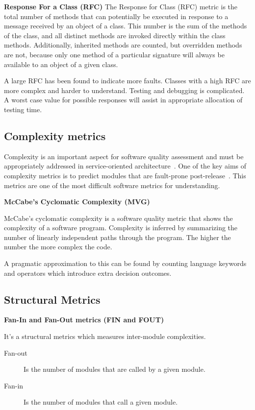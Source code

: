 \textbf{Response For a Class (RFC)} 
The Response for Class (RFC) metric is the total number of methods that can potentially be executed in response to a message received by an object of a class. This number is the sum of the methods of the class, and all distinct methods are invoked directly within the class methods. Additionally, inherited
methods are counted, but overridden methods are not, because only one method of a particular signature will always be available to an object of a given class.

A large RFC has been found to indicate more faults. Classes with a high RFC are more complex and harder to understand. Testing and debugging is complicated. A worst case value for possible responses will assist in appropriate allocation of testing time.
\subsection{Complexity metrics}
Complexity is an important aspect for software quality assessment and must be appropriately addressed in service-oriented architecture~\cite{complexity}. One  of  the  key  aims  of  complexity  metrics  is  to  predict modules   that are fault-prone post-release~\cite{complexity2}. This metrics are one of the most difficult software metrics for understanding.

\textbf{McCabe's Cyclomatic Complexity (MVG)}

McCabe's cyclomatic complexity is a software quality metric that shows the complexity of a software program. Complexity is inferred by summarizing the number of linearly independent paths through the program. The higher the number the more complex the code.

A pragmatic approximation to this can be found by counting language keywords and operators which introduce extra decision outcomes.
\subsection{Structural Metrics}

\textbf{Fan-In and Fan-Out metrics (FIN and FOUT)}

It's a structural metrics which measures inter-module complexities. 
\begin{description}
	\item[Fan-out] Is the number of modules that are called by a given module.
	\item[Fan-in] Is the number of modules that call a given module.
\end{description}

